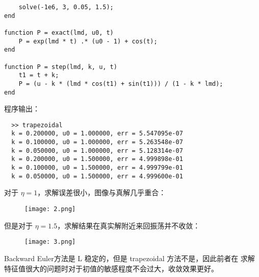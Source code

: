 \documentclass[lang=cn,a4paper,newtx,bibend=bibtex]{elegantpaper}
\begin{document}
\begin{solution}
\begin{verbatim}
    solve(-1e6, 3, 0.05, 1.5);
end

function P = exact(lmd, u0, t)
    P = exp(lmd * t) .* (u0 - 1) + cos(t);
end

function P = step(lmd, k, u, t)
    t1 = t + k;
    P = (u - k * (lmd * cos(t1) + sin(t1))) / (1 - k * lmd);
end
\end{verbatim}
程序输出：
\begin{verbatim}
  >> trapezoidal
  k = 0.200000, u0 = 1.000000, err = 5.547095e-07
  k = 0.100000, u0 = 1.000000, err = 5.263548e-07
  k = 0.050000, u0 = 1.000000, err = 5.128314e-07
  k = 0.200000, u0 = 1.500000, err = 4.999898e-01
  k = 0.100000, u0 = 1.500000, err = 4.999799e-01
  k = 0.050000, u0 = 1.500000, err = 4.999600e-01
\end{verbatim}
对于 $\eta = 1$，求解误差很小，图像与真解几乎重合：
\begin{figure}[H]
  \centering
  \texttt{[image: 2.png]}
\end{figure}
但是对于 $\eta = 1.5$，求解结果在真实解附近来回振荡并不收敛：
\begin{figure}[H]
  \centering
  \texttt{[image: 3.png]}
\end{figure}
Backward Euler方法是 L 稳定的，但是 trapezoidal 方法不是，因此前者在
求解特征值很大的问题时对于初值的敏感程度不会过大，收敛效果更好。
\end{solution}
\end{document}
